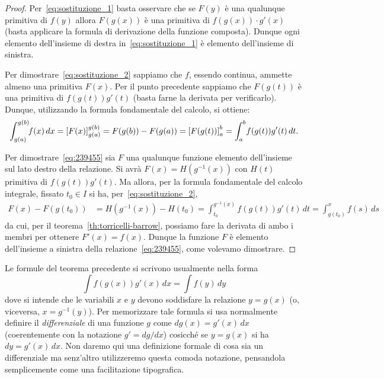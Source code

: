 \begin{proof}
Per~\eqref{eq:sostituzione_1}
basta osservare che se $F(y)$ è una qualunque primitiva di $f(y)$ 
allora $F(g(x))$ è una primitiva di $f(g(x))\cdot g'(x)$
(basta applicare la formula di derivazione della funzione composta).
Dunque ogni elemento dell'insieme di destra in~\eqref{eq:sostituzione_1}
è elemento dell'insieme di sinistra.

Per dimostrare~\eqref{eq:sostituzione_2} sappiamo che $f$, essendo continua, ammette almeno una
primitiva $F(x)$. Per il punto precedente sappiamo che $F(g(t))$ è una
primitiva di $f(g(t))g'(t)$ (basta farne la derivata per verificarlo).
Dunque, utilizzando la formula fondamentale del calcolo, si ottiene:
\[
\int_{g(a)}^{g(b)}\!\! f(x) \, dx
= {\left[ F(x) \right]}_{g(a)}^{g(b)}
= F(g(b)) - F(g(a))
= {\left[ F(g(t)) \right]}_a^b
=\int_a^b\! f(g(t))g'(t)\, dt.
\]

Per dimostrare~\eqref{eq:239455}
sia $F$ una qualunque funzione elemento dell'insieme sul lato destro della
relazione.
Si avrà $F(x) = H(g^{-1}(x))$ con $H(t)$ primitiva
di $f(g(t))g'(t)$. 
Ma allora, per la formula fondamentale del calcolo integrale,
fissato $t_0 \in I$ si ha, per~\eqref{eq:sostituzione_2},
%
\begin{align*}
  F(x) - F(g(t_0))
  &= H(g^{-1}(x)) - H(t_0)
  = \int_{t_0}^{g^{-1}(x)} f(g(t)) g'(t)\, dt
  = \int_{g(t_0)}^x f(s)\, ds
\end{align*}
da cui, per il teorema~\ref{th:torricelli-barrow}, 
possiamo fare la derivata di 
ambo i membri per ottenere
$F'(x) = f(x)$. 
Dunque la funzione $F$ è elemento dell'insieme a 
sinistra della relazione~\eqref{eq:239455},
come volevamo dimostrare.
\end{proof}

Le formule del teorema precedente si scrivono usualmente nella forma
\[
  \int f(g(x)) g'(x)\, dx = \int f(y) \, dy
\]
dove si intende che le variabili $x$ e $y$ devono soddisfare la relazione
$y=g(x)$ (o, viceversa, $x=g^{-1}(y)$).
Per memorizzare tale formula si usa normalmente definire il
\emph{differenziale} di una funzione $g$ come $dg(x) = g'(x)\, dx$
(coerentemente con la notazione $g' = dg / dx$)
cosicché se $y=g(x)$ si ha $dy = g'(x)\, dx$.
Non daremo qui una definizione formale di cosa sia un differenziale
ma senz'altro utilizzeremo questa comoda notazione, pensandola
semplicemente come una facilitazione tipografica.

